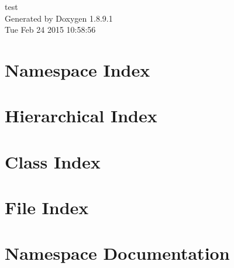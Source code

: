 \documentclass[twoside]{book}
\newcommand{\+}{\discretionary{\mbox{\scriptsize$\hookleftarrow$}}{}{}}
\newcommand{\clearemptydoublepage}{%
  \newpage{\pagestyle{empty}\cleardoublepage}%
}
\begin{document}
\hypersetup{pageanchor=false,
             bookmarks=true,
             bookmarksnumbered=true,
             pdfencoding=unicode
            }
\begin{titlepage}
\vspace*{7cm}
\begin{center}%
{\Large test }\\
\vspace*{1cm}
{\large Generated by Doxygen 1.8.9.1}\\
\vspace*{0.5cm}
{\small Tue Feb 24 2015 10:58:56}\\
\end{center}
\end{titlepage}
\clearemptydoublepage
\tableofcontents
\clearemptydoublepage
{}
\hypersetup{pageanchor=true}

\chapter{Namespace Index}

\chapter{Hierarchical Index}

\chapter{Class Index}

\chapter{File Index}

\chapter{Namespace Documentation}



\end{document}
